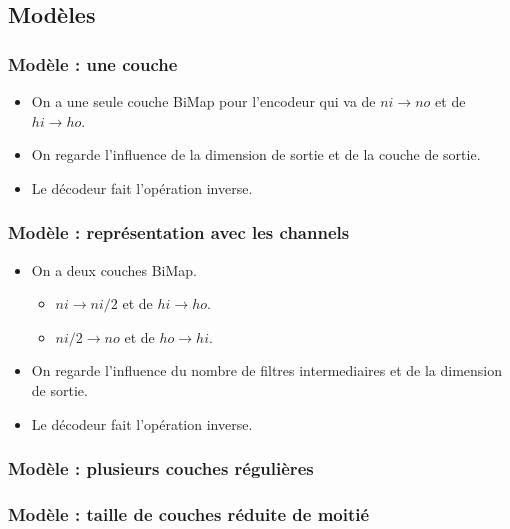 \documentclass{beamer}
\begin{document}
\subsection{Modèles}
\begin{frame}
\frametitle{Modèle : une couche}
\begin{itemize}
    \item On a une seule couche BiMap pour l'encodeur qui va de $ni\rightarrow no$ et de $hi\rightarrow ho$.
    \item On regarde l'influence de la dimension de sortie et de la couche de sortie.
    \item Le décodeur fait l'opération inverse.
\end{itemize}
\end{frame}

\begin{frame}
\frametitle{Modèle : représentation avec les channels}
\begin{itemize}
    \item On a deux couches BiMap.
        \begin{itemize}
            \item $ni\rightarrow ni/2$ et de $hi\rightarrow ho$.
            \item $ni/2\rightarrow no$ et de $ho\rightarrow hi$.
        \end{itemize}
    \item On regarde l'influence du nombre de filtres intermediaires et de la dimension de sortie.
    \item Le décodeur fait l'opération inverse.
\end{itemize}
\end{frame}

\begin{frame}
\frametitle{Modèle : plusieurs couches régulières}

\end{frame}

\begin{frame}
\frametitle{Modèle : taille de couches réduite de moitié}

\end{frame}


\end{document}
